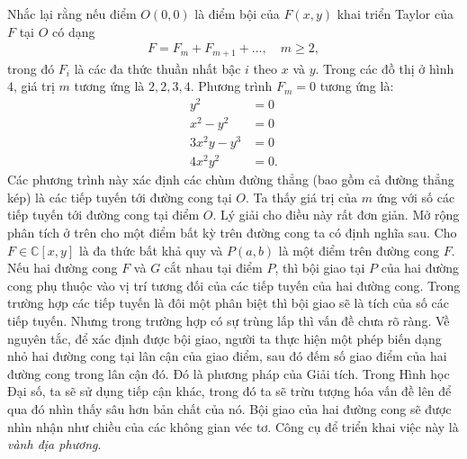\begin{multicols}{2}
	Nhắc lại rằng nếu điểm $O(0,0)$ là điểm bội của $F(x,y)$ khai triển Taylor của $F$ tại $O$ có dạng
	\begin{align*}
		F=F_m+F_{m+1}+\ldots, \quad m\geq 2,
	\end{align*}
	trong đó $F_i$ là các đa thức thuần nhất bậc $i$ theo $x$ và $y$. 
	\vskip 0.1cm
	Trong các đồ thị ở hình $4$, giá trị $m$ tương ứng là $2,2,3,4$. Phương trình
	$F_m=0$
	tương ứng là:
	\begin{align*}
		y^2&=0\\
		x^2-y^2&=0\\
		3x^2y-y^3&=0\\
		4x^2y^2&=0.
	\end{align*} 
	Các phương trình này xác định các chùm đường thẳng (bao gồm cả đường thẳng kép) là các tiếp tuyến tới đường cong tại $O$. 
	\vskip 0.1cm
	Ta thấy giá trị của $m$ ứng với số các tiếp tuyến tới đường cong tại điểm $O$. Lý giải cho điều này rất đơn giản. 
	\vskip 0.1cm
	\vskip 0.1cm
	Mở rộng phân tích ở trên cho một điểm bất kỳ trên đường cong ta có định nghĩa sau. 
	Cho $F\in \mathbb C[x,y]$ là đa thức bất khả quy và $P(a,b)$ là một điểm trên đường cong $F$. 
	\vskip 0.1cm
	\vskip 0.1cm
	Nếu hai đường cong $F$  và $G$  cắt nhau tại điểm $P$, thì bội giao tại $P$ của hai đường cong phụ thuộc vào vị trí tương đối của các tiếp tuyến của hai đường cong. Trong trường hợp các tiếp tuyến là đôi một phân biệt thì bội giao sẽ là tích của số các tiếp tuyến. Nhưng trong trường hợp có sự trùng lấp thì vấn đề chưa rõ ràng. 
	\vskip 0.1cm
	Về nguyên tắc, để xác định được bội giao, người ta thực hiện một phép biến dạng nhỏ hai đường cong tại lân cận của giao điểm, sau đó đếm số giao điểm của hai đường cong trong lân cận đó. Đó là phương pháp của Giải tích. Trong Hình học Đại số, ta sẽ sử dụng tiếp cận khác, trong đó ta sẽ trừu tượng hóa vấn đề lên để qua đó nhìn thấy sâu hơn bản chất của nó. Bội giao của hai đường cong sẽ được nhìn nhận như chiều của các không gian véc tơ. Công cụ để triển khai việc này là {\em vành địa phương}. 

\end{multicols}

